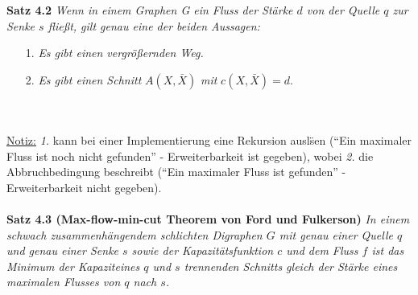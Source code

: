 \documentclass[11pt]{article}
\begin{document}
    \textbf{Satz 4.2} \textit{Wenn in einem Graphen G ein Fluss der St\"arke $d$ von der Quelle $q$ zur Senke $s$ flie\ss{}t, gilt genau eine der beiden Aussagen:}
    \begin{itemize}
        \item[1.] \textit{Es gibt einen vergr\"o\ss{}ernden Weg.}
        \item[2.] \textit{Es gibt einen Schnitt} $A(X,\bar X)$ \textit{mit} $c(X,\bar X) = d$.
    \end{itemize}\\~\\
    \underline{Notiz:} \textit{1.} kann bei einer Implementierung eine Rekursion ausl\"sen ("`Ein maximaler Fluss ist noch nicht gefunden"' - Erweiterbarkeit ist gegeben), wobei \textit{2.} die Abbruchbedingung beschreibt ("`Ein maximaler Fluss ist gefunden"' - Erweiterbarkeit nicht gegeben).\\~\\
    \textbf{Satz 4.3 (Max-flow-min-cut Theorem von Ford und Fulkerson)} \textit{In einem schwach zusammenh\"angendem schlichten Digraphen $G$ mit genau
    einer Quelle $q$ und genau einer Senke $s$ sowie der Kapazit\"atsfunktion $c$ und
    dem Fluss $f$ ist das Minimum der Kapazit\at eines $q$ und $s$ trennenden Schnitts
    gleich der St\"arke eines maximalen Flusses von $q$ nach $s$.}
\end{document}

